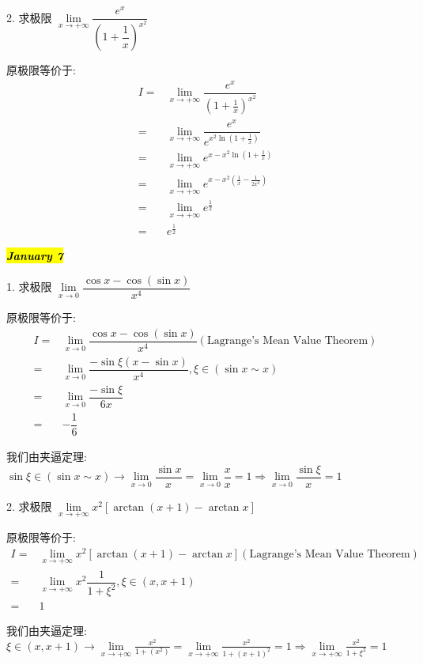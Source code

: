 2. 求极限 $\lim\limits_{x\to +\infty}\dfrac{e^{x}}{(1+\dfrac{1}{x})^{x^{2}}}$
\begin{solution}
	
	原极限等价于:
	\begin{align*}
		I = & \lim\limits_{x\to +\infty}\dfrac{e^{x}}{(1+\frac{1}{x})^{x^{2}}}\\
		  = & \lim\limits_{x\to +\infty}\dfrac{e^{x}}{e^{x^{2}\ln(1+\frac{1}{x})}}\\
		  = & \lim\limits_{x\to +\infty}e^{x-x^{2}\ln(1+\frac{1}{x})}\\
		  = & \lim\limits_{x\to +\infty}e^{x-x^{2}(\frac{1}{x}-\frac{1}{2x^{2}})}\\
		  = & \lim\limits_{x\to +\infty}e^{\frac{1}{2}}\\
		  = & e^{\frac{1}{2}}
	\end{align*}
\end{solution}
\hl{\textbf{\textit{January 7}}}

1. 求极限 $\lim\limits_{x\to 0}\dfrac{\cos x-\cos(\sin x)}{x^{4}}$
\begin{solution}
	
	原极限等价于:
	\begin{align*}
		I = & \lim\limits_{x\to 0}\dfrac{\cos x-\cos(\sin x)}{x^{4}} (\text{Lagrange's Mean Value Theorem})\\
		  = & \lim\limits_{x\to 0}\dfrac{-\sin \xi(x-\sin x)}{x^{4}}, \xi\in (\sin x\sim x)\\
		  = & \lim\limits_{x\to 0}\dfrac{-\sin \xi}{6x}\\
		  = & -\dfrac{1}{6}
	\end{align*}

	我们由夹逼定理: $\sin \xi \in (\sin x\sim x)\to \lim\limits_{x\to 0}\dfrac{\sin x}{x} = \lim\limits_{x\to 0}\dfrac{x}{x}=1\Rightarrow \lim\limits_{x\to 0}\dfrac{\sin \xi}{x} = 1$

\end{solution}

2. 求极限 $\lim\limits_{x\to +\infty}x^{2}\left[\arctan(x+1)-\arctan x\right]$
\begin{solution}
	
	原极限等价于:
	\begin{align*}
		I = & \lim\limits_{x\to +\infty}x^{2}[\arctan(x+1)-\arctan x](\text{Lagrange's Mean Value Theorem})\\
		  = & \lim\limits_{x\to +\infty}x^{2}\dfrac{1}{1+\xi^{2}},\xi\in(x,x+1)\\
		  = & 1
	\end{align*}

	我们由夹逼定理: $\xi\in (x, x+1)\to \lim\limits_{x\to +\infty}\frac{x^{2}}{1+(x^{2})} = \lim\limits_{x\to +\infty}\frac{x^{2}}{1+(x+1)^{2}}=1\Rightarrow \lim\limits_{x\to +\infty}\frac{x^{2}}{1+\xi^{2}} = 1$
\end{solution}

